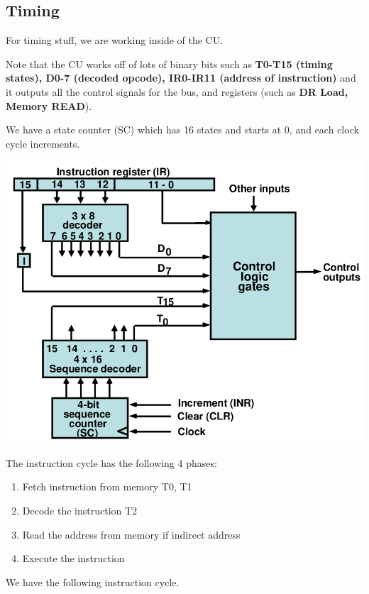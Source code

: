 \documentclass[12pt,letterpaper]{article} \usepackage{amsmath} \usepackage{graphicx} \usepackage[margin=1in]{geometry} \usepackage{longtable}  \usepackage{amssymb}
\begin{document}
			\subsection{Timing}
			For timing stuff, we are working inside of the CU.
			
			Note that the CU works off of lots of binary bits such as\textbf{ T0-T15 (timing states), D0-7 (decoded opcode), IR0-IR11 (address of instruction)} and it outputs all the control signals for the bus, and registers (such as \textbf{DR Load, Memory READ}).
			
			We have a state counter (SC) which has 16 states and starts at 0, and each clock cycle increments. 
			
			\begin{center}
				\includegraphics[width=0.6\linewidth]{cu}
			\end{center}
		
			The instruction cycle has the following 4 phases:
			\begin{enumerate}[]
				\item Fetch instruction from memory T0, T1
				\item Decode the instruction T2
				\item Read the address from memory if indirect address
				\item Execute the instruction
			\end{enumerate}
		
			We have the following instruction cycle. 
			
\end{document}
